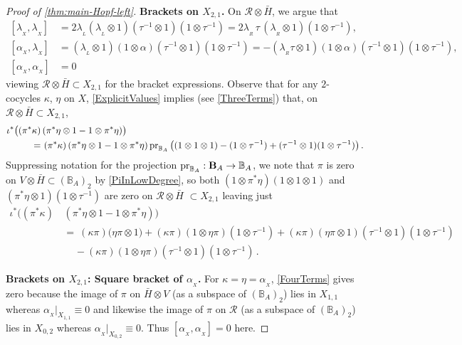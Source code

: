 \documentclass[11pt]{amsart}
\numberwithin{equation}{section}
\newcommand{\X}{_X}
\newcommand{\alphax}{\alpha_{\X}}
\newcommand{\lambdax}{\lambda_{\X}}
\newcommand{\gammax}{\kappa} %
\newcommand{\etax}{\eta}
\newcommand{\pr}{ {\rm{pr}} }%
\newcommand{\R}{\mathcal{R}}
\newcommand{\B}{{\bf B}} %
\newcommand{\BB}{\mathbb{B}} %
\newcommand{\itau}{{\tau^{-1}}}%
\renewcommand{\_}[1]{\mbox{$_{\left( #1 \right)}$}}
\newcommand{\ot}{\otimes}
\begin{document}
{\begin{proof}[Proof of \cref{thm:main-Hopf-left}]
 
 {\bf Brackets on $X_{2,1}$.}
On $\R\ot \bar H$, we argue that 
$$
\begin{aligned}
[\lambdax , \lambdax]
&=  2 \lambda_{_L} (\lambda_{_L}\ot 1) (\itau\ot 1)(1\ot\itau)
= 2 \lambda_{_R}\, \tau \, (\lambda_{_R}\ot 1)(1\ot\itau),
\\
  [\alphax,\lambdax ] 
  &=  (\lambda_{_L} \ot 1) (1\ot \alpha)(\itau\ot 1)(1\ot \itau )
=  -(\lambda_{_R} \tau \ot 1) (1\ot \alpha)(\itau\ot 1)(1\ot \itau ),
\\
[\alphax,\alphax]
&= 0\,
   \end{aligned}
   $$
   viewing $\R\ot \bar H\subset X_{2,1}$ for the bracket expressions.
 Observe that for any $2$-cocycles $\kappa$, $\eta$ on $X$,
 \cref{ExplicitValues} implies (see \cref{ThreeTerms})
 that,  on  $\R\ot \bar H\subset X_{2,1}$, 
    $$
   \begin{aligned}
    \iota^* \big(
    (\pi^*\gammax)& \,  (\pi^*\etax\ot 1 - 1\ot \pi^*\etax)\big)
     \\ =& \ 
    (\pi^*\gammax)\, (\pi^*\etax \ot 1 - 1\ot \pi^*\etax) 
    \, \pr_{\BB_A}\, 
    \big((1\ot 1\ot 1) - (1\ot \itau)+(\itau\ot 1)(1\ot \itau)\big)\, .
       \end{aligned}
   $$
Suppressing notation for the projection
  $\pr_{\BB_A}:\B_A\rightarrow \BB_A$, we note that 
  $\pi$ is zero on $V\ot \bar H\subset (\BB_A)_2$ by
  \cref{PiInLowDegree},
  so both
  $(1\ot \pi^*\eta) (1\ot 1\ot 1)$
  and $(\pi^*\eta\ot 1)(1\ot \itau)$ 
are zero on $\R\ot \bar H$
$\subset X_{2,1}$ leaving just 
 \begin{equation}\label{FourTerms}
   \begin{aligned}
    \iota^* \big(
    (\pi^*\gammax)\, & (\pi^*\etax\ot 1 - 1\ot \pi^*\etax)\big)
    \\ &=\ 
    (\gammax\pi)  \big(\etax\pi\ot 1)
    + (\gammax\pi) (1\ot \etax\pi) 
    (1\ot \itau)
    + (\gammax\pi) (\etax\pi \ot 1)
    (\itau\ot 1)(1\ot\itau)
    \\ & \ \ \ \ \ 
   -(\gammax\pi) (1\ot \etax\pi) (\itau\ot 1)(1\ot\itau)\, .
   \end{aligned}
  \end{equation}

{\bf Brackets on $X_{2,1}$: Square bracket of $\alphax$.}
  For $\gammax=\etax=\alphax$, \cref{FourTerms} gives zero because
  the image of  $\pi$ on $\bar H\ot V$ (as a subspace of $(\BB_A)_2$)
  lies in $X_{1,1}$ whereas $\alphax|_{X_{1,1}}\equiv 0$ 
  and likewise the image of $\pi$ on $\R$ (as a subspace of $(\BB_A)_2$)
  lies in $X_{0,2}$ whereas $\alphax|_{X_{0,2}}\equiv 0$.
  Thus $[\alphax,\alphax]=0$ here.


\end{proof}}
\end{document}
